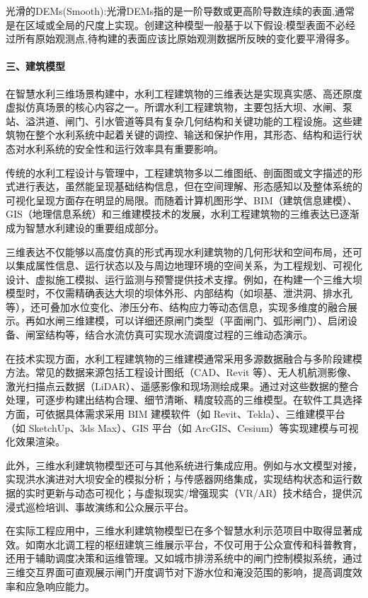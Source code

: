 光滑的DEMs(Smooth):光滑DEMs指的是一阶导数或更高阶导数连续的表面,通常是在区域或全局的尺度上实现。创建这种模型一般基于以下假设:模型表面不必经过所有原始观测点,待构建的表面应该比原始观测数据所反映的变化要平滑得多。

\paragraph{三、建筑模型}\label{ux4e09ux5efaux7b51ux6a21ux578b}

在智慧水利三维场景构建中，水利工程建筑物的三维表达是实现真实感、高还原度虚拟仿真场景的核心内容之一。所谓水利工程建筑物，主要包括大坝、水闸、泵站、溢洪道、闸门、引水管道等具有复杂几何结构和关键功能的工程设施。这些建筑物在整个水利系统中起着关键的调控、输送和保护作用，其形态、结构和运行状态对水利系统的安全性和运行效率具有重要影响。

传统的水利工程设计与管理中，工程建筑物多以二维图纸、剖面图或文字描述的形式进行表达，虽然能呈现基础结构信息，但在空间理解、形态感知以及整体系统的可视化呈现方面存在明显的局限。而随着计算机图形学、BIM（建筑信息建模）、GIS（地理信息系统）和三维建模技术的发展，水利工程建筑物的三维表达已逐渐成为智慧水利建设的重要组成部分。

三维表达不仅能够以高度仿真的形式再现水利建筑物的几何形状和空间布局，还可以集成属性信息、运行状态以及与周边地理环境的空间关系，为工程规划、可视化设计、虚拟施工模拟、运行监测与预警提供技术支撑。例如，在构建一个三维大坝模型时，不仅需精确表达大坝的坝体外形、内部结构（如坝基、泄洪洞、排水孔等），还可叠加水位变化、渗压分布、结构应力等动态信息，实现多维度的融合展示。再如水闸三维建模，可以详细还原闸门类型（平面闸门、弧形闸门）、启闭设备、闸室结构等，结合水流仿真可实现水流调度过程的三维动态演示。

在技术实现方面，水利工程建筑物的三维建模通常采用多源数据融合与多阶段建模方法。常见的数据来源包括工程设计图纸（CAD、Revit
等）、无人机航测影像、激光扫描点云数据（LiDAR）、遥感影像和现场测绘成果。通过对这些数据的整合处理，可逐步构建出结构合理、细节清晰、精度较高的三维模型。在软件工具选择方面，可依据具体需求采用
BIM 建模软件（如 Revit、Tekla）、三维建模平台（如 SketchUp、3ds
Max）、GIS 平台（如 ArcGIS、Cesium）等实现建模与可视化效果渲染。

此外，三维水利建筑物模型还可与其他系统进行集成应用。例如与水文模型对接，实现洪水演进对大坝安全的模拟分析；与传感器网络集成，实现结构状态和运行数据的实时更新与动态可视化；与虚拟现实/增强现实（VR/AR）技术结合，提供沉浸式巡检培训、事故演练和公众展示平台。

在实际工程应用中，三维水利建筑物模型已在多个智慧水利示范项目中取得显著成效。如南水北调工程的枢纽建筑三维展示平台，不仅可用于公众宣传和科普教育，还用于辅助调度决策和运维管理。又如城市排涝系统中的闸门控制模拟系统，通过三维交互界面可直观展示闸门开度调节对下游水位和淹没范围的影响，提高调度效率和应急响应能力。

